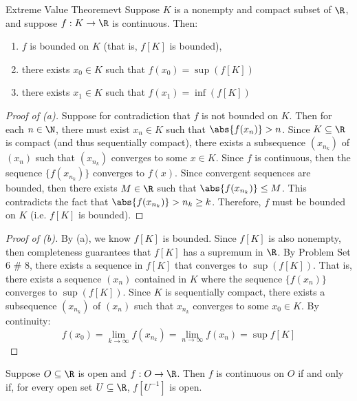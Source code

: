 \begin{thmbox}{Extreme Value Theorem}{evt}
    Suppose $K$ is a nonempty and compact subset of $\R$, and suppose $f : K \to \R$ is continuous. Then:
    \begin{enumerate}[label=(\alph*)]
        \item $f$ is bounded on $K$ (that is, $f[K]$ is bounded),
        \item there exists $x_0 \in K$ such that $f(x_0) = \sup( f[K] )$
        \item there exists $x_1 \in K$ such that $f(x_1) = \inf( f[K] )$
    \end{enumerate}
    \tcblower
    \begin{proof}[Proof of (a)]
        Suppose for contradiction that $f$ is not bounded on $K$. Then for each $n \in \N$, there must exist $x_n \in K$ such that $\abs{f(x_n)} > n$. Since $K \subseteq \R$ is compact (and thus sequentially compact), there exists a subsequence $(x_{n_k})$ of $(x_n)$ such that $(x_{n_k})$ converges to some $x \in K$. Since $f$ is continuous, then the sequence $\{ f(x_{n_k}) \}$ converges to $f(x)$. Since convergent sequences are bounded, then there exists $M \in \R$ such that $\abs{f(x_{n_k})} \leq M$. This contradicts the fact that $\abs{f(x_{n_k})} > n_k \geq k$. Therefore, $f$ must be bounded on $K$ (i.e. $f[K]$ is bounded).
    \end{proof}

    \begin{proof}[Proof of (b)]
        By (a), we know $f[K]$ is bounded. Since $f[K]$ is also nonempty, then completeness guarantees that $f[K]$ has a supremum in $\R$. By Problem Set 6 \# 8, there exists a sequence in $f[K]$ that converges to $\sup(f[K])$. That is, there exists a sequence $(x_n)$ contained in $K$ where the sequence $\{ f(x_n) \}$ converges to $\sup(f[K])$. Since $K$ is sequentially compact, there exists a subsequence $(x_{n_k})$ of $(x_n)$ such that $x_{n_k}$ converges to some $x_0 \in K$. By continuity:
        \[ f(x_0) = \lim_{k \to \infty} f(x_{n_k}) = \lim_{n \to \infty} f(x_n) = \sup f[K] \]
    \end{proof}
\end{thmbox}



\begin{thmbox}{}{}
    Suppose $O \subseteq \R$ is open and $f : O \to \R$. Then $f$ is continuous on $O$ if and only if, for every open set $U \subseteq \R$, $f[U^{-1}]$ is open.
\end{thmbox}

